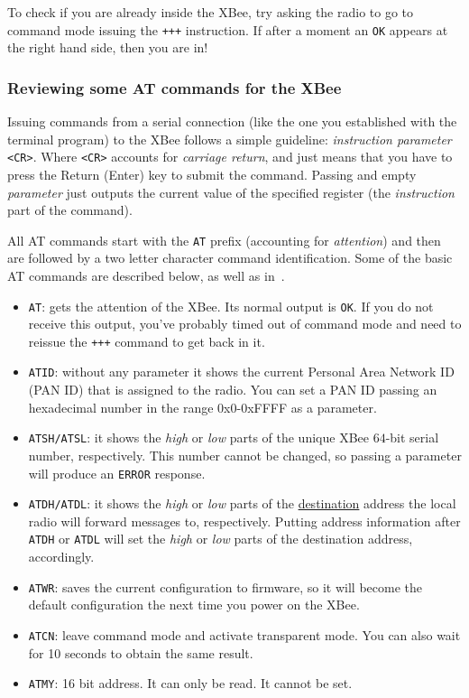 To check if you are already inside the XBee, try asking the radio to go to command mode issuing the \texttt{+++} instruction. If after a moment an \texttt{OK} appears at the right hand side, then you are in!

\subsubsection{Reviewing some AT commands for the XBee}

Issuing commands from a serial connection (like the one you established with the terminal program) to the XBee follows a simple guideline: \emph{instruction parameter} \texttt{<CR>}. Where \texttt{<CR>} accounts for \emph{carriage return}, and just means that you have to press the Return (Enter) key to submit the command. Passing and empty \emph{parameter} just outputs the current value of the specified register (the \emph{instruction} part of the command).

All AT commands start with the \texttt{AT} prefix (accounting for \emph{attention}) and then are followed by a two letter character command identification. Some of the basic AT commands are described below, as well as in~\cite{faludi2010bws}.

\begin{itemize}
	\item \texttt{AT}: gets the attention of the XBee. Its normal output is \texttt{OK}. If you do not receive this output,  you've probably timed out of command mode and need to reissue the \texttt{+++} command to get back in it.
	\item \texttt{ATID}: without any parameter it shows the current Personal Area Network ID (PAN ID) that is assigned to the radio. You can set a PAN ID passing an hexadecimal number in the range $0$x$0$-$0$xFFFF as a parameter.
	\item \texttt{ATSH/ATSL}: it shows the \emph{high} or \emph{low} parts of the unique XBee $64$-bit serial number, respectively. This number cannot be changed, so passing a parameter will produce an \texttt{ERROR} response.
	\item \texttt{ATDH/ATDL}: it shows the \emph{high} or \emph{low} parts of the \underline{destination} address the local radio will forward messages to, respectively. Putting address information after \texttt{ATDH} or \texttt{ATDL} will set the \emph{high} or \emph{low} parts of the destination address, accordingly.
	\item \texttt{ATWR}: saves the current configuration to firmware, so it will become the default configuration the next time you power on the XBee.
    \item \texttt{ATCN}: leave command mode and activate transparent mode. You can also wait for 10 seconds to obtain the same result.
    \item \texttt{ATMY}: 16 bit address. It can only be read. It cannot be set.
\end{itemize}

		

